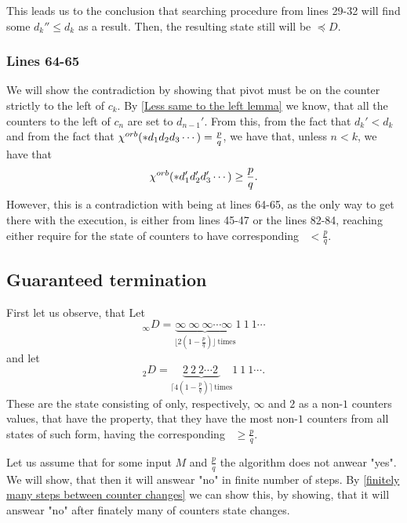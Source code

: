 This leads us to the conclusion that searching procedure from lines 
29-32 will find some $ d_k'' \leq d_k$ as a result. Then, the resulting state 
still will be $\preceq D$. 

\subsubsection{Lines 64-65}
We will show the contradiction by showing that pivot must be on 
the counter strictly to the left of $c_k$. 
By \ref{Less same to the left lemma} 
we know, that all the counters to the left of $c_n$ are set to $d_{n-1}'$. 
From this, from the fact that $d_k' < d_k$ and 
from the fact that ${\chi^{orb}(*d_1d_2d_3\cdots)} = \frac{p}{q}$, 
we have that, unless $n < k$, we have that 
\begin{equation}
{\chi^{orb}(*d_1'd_2'd_3'\cdots)} \geq \frac{p}{q}.
\end{equation}
However, this is a contradiction with being at lines 64-65, as 
the only way to get there with the execution, is either from lines 
45-47 or the lines 82-84, reaching either require for the state of counters to have 
corresponding \Eoc\ $<\frac{p}{q}$.


\subsection{Guaranteed termination}
First let us observe, that 
Let 
\begin{equation}
_\infty D = \underbrace{\infty\ \infty\ \infty\cdots 
\infty\ }_{\lfloor 2(1-\frac{p}{q})\rfloor\ \mathrm{times}}1\ 1\ 1\cdots
\end{equation}
and let 
\begin{equation}
_2D = \underbrace{2\ 2\ 2\cdots 
2\ }_{\lceil 4(1-\frac{p}{q})\rceil\ \mathrm{times}}1\ 1\ 1\cdots.
\end{equation}
These are the state consisting of only, respectively, $\infty$ and $2$ as a non-$1$ counters 
values, that have the property, that they have the most non-$1$ counters from all 
states of such form, having the corresponding \Eoc\ $\geq\frac{p}{q}$. 

Let us assume that for some input $M$ and $\frac{p}{q}$ the algorithm does not anwear "yes". 
We will show, that then it will answear "no" in finite number of steps. By 
\ref{finitely many steps between counter changes} 
we can show this, by showing, that it will answear "no" after 
finately many of counters state changes. 
